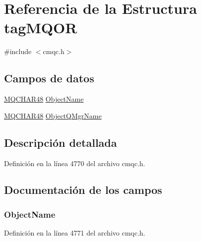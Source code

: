 \hypertarget{structtag_m_q_o_r}{}\section{Referencia de la Estructura tag\+M\+Q\+O\+R}
\label{structtag_m_q_o_r}


{\ttfamily \#include $<$cmqc.\+h$>$}

\subsection*{Campos de datos}
\begin{DoxyCompactItemize}
\item 
\hyperlink{cmqc_8h_a53b1a2836da03f19144836725ff77919}{M\+Q\+C\+H\+A\+R48} \hyperlink{structtag_m_q_o_r_a2106fb125a9f7fc606340ba23c006bc0}{Object\+Name}
\item 
\hyperlink{cmqc_8h_a53b1a2836da03f19144836725ff77919}{M\+Q\+C\+H\+A\+R48} \hyperlink{structtag_m_q_o_r_ac72719d0cdc669269aa503462d5c7536}{Object\+Q\+Mgr\+Name}
\end{DoxyCompactItemize}


\subsection{Descripción detallada}


Definición en la línea 4770 del archivo cmqc.\+h.



\subsection{Documentación de los campos}
\hypertarget{structtag_m_q_o_r_a2106fb125a9f7fc606340ba23c006bc0}{}
\subsubsection[{Object\+Name}]{ Object\+Name}\label{structtag_m_q_o_r_a2106fb125a9f7fc606340ba23c006bc0}


Definición en la línea 4771 del archivo cmqc.\+h.

\hypertarget{structtag_m_q_o_r_ac72719d0cdc669269aa503462d5c7536}{}
